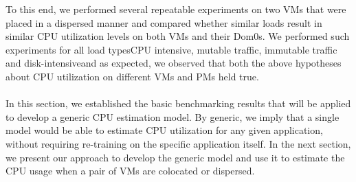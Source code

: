 To this end, we performed several repeatable experiments 
on two VMs that were placed in a dispersed manner and compared whether 
similar loads result in similar CPU utilization levels on both VMs
and their Dom0s. We performed such experiments for all load 
types\textemdash{}CPU intensive, mutable traffic, immutable traffic
and disk-intensive\textemdash{}and as expected, we observed that both the
above hypotheses about CPU utilization on different VMs 
and PMs held true.
\\
\\
In this section, we established the basic benchmarking results that
will be applied to develop a generic CPU estimation model. By generic,
we imply that a single model would be able to estimate CPU utilization
for any given application, without requiring re-training on the specific
application itself.
In the next section, we present our approach to develop the generic
model and use it to estimate the CPU usage when a pair
of VMs are colocated or dispersed.

